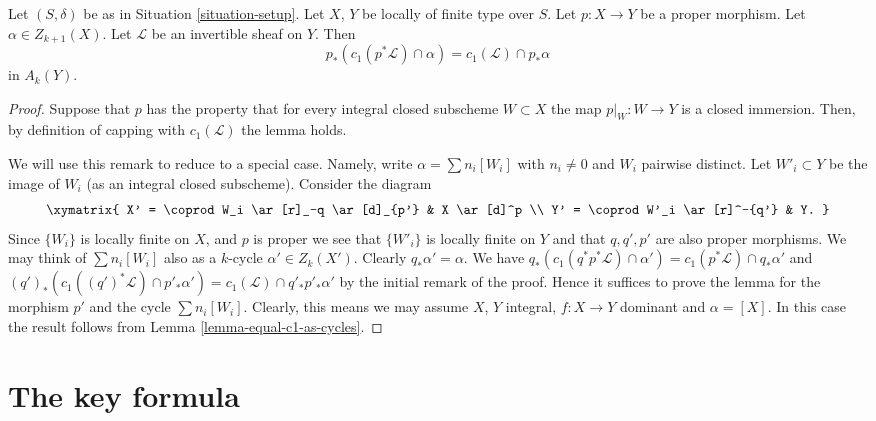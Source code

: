 \begin{lemma}
\label{lemma-pushforward-cap-c1}
Let $(S, \delta)$ be as in Situation \ref{situation-setup}.
Let $X$, $Y$ be locally of finite type over $S$.
Let $p : X \to Y$ be a proper morphism.
Let $\alpha \in Z_{k + 1}(X)$.
Let $\mathcal{L}$ be an invertible sheaf on $Y$.
Then
$$
p_*(c_1(p^*\mathcal{L}) \cap \alpha) = c_1(\mathcal{L}) \cap p_*\alpha
$$
in $A_k(Y)$.
\end{lemma}

\begin{proof}
Suppose that $p$ has the property that for every integral
closed subscheme $W \subset X$ the map $p|_W : W \to Y$
is a closed immersion. Then, by definition of capping
with $c_1(\mathcal{L})$ the lemma holds.

\medskip\noindent
We will use this remark to reduce to a special case. Namely,
write $\alpha = \sum n_i[W_i]$ with $n_i \not = 0$ and $W_i$ pairwise
distinct. Let $W'_i \subset Y$ be the image of $W_i$ (as an integral
closed subscheme). Consider the diagram
$$
\xymatrix{
X' = \coprod W_i \ar[r]_-q \ar[d]_{p'} & X \ar[d]^p \\
Y' = \coprod W'_i \ar[r]^-{q'} & Y.
}
$$
Since $\{W_i\}$ is locally finite on $X$, and $p$ is proper
we see that $\{W'_i\}$ is locally finite on $Y$ and that
$q, q', p'$ are also proper morphisms.
We may think of $\sum n_i[W_i]$ also as a $k$-cycle
$\alpha' \in Z_k(X')$. Clearly $q_*\alpha' = \alpha$.
We have
$q_*(c_1(q^*p^*\mathcal{L}) \cap \alpha')
= c_1(p^*\mathcal{L}) \cap q_*\alpha'$
and
$(q')_*(c_1((q')^*\mathcal{L}) \cap p'_*\alpha') =
c_1(\mathcal{L}) \cap q'_*p'_*\alpha'$ by the initial
remark of the proof. Hence it suffices to prove the lemma
for the morphism $p'$ and the cycle $\sum n_i[W_i]$.
Clearly, this means we may assume $X$, $Y$ integral,
$f : X \to Y$ dominant and $\alpha = [X]$.
In this case the result follows from
Lemma \ref{lemma-equal-c1-as-cycles}.
\end{proof}






\section{The key formula}
\label{section-key}

